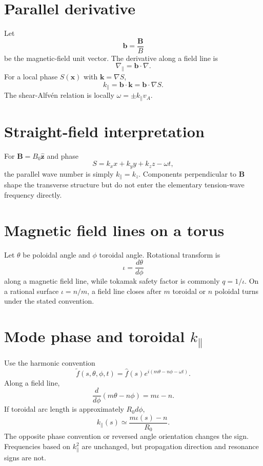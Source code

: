 \documentclass[11pt]{article}
\begin{document}
\section{Parallel derivative}

Let
\begin{equation}
\mathbf b=\frac{\mathbf B}{B}
\end{equation}
be the magnetic-field unit vector. The derivative along a field line is
\begin{equation}
\nabla_\parallel=\mathbf b\cdot\nabla.
\end{equation}
For a local phase $S(\mathbf x)$ with $\mathbf k=\nabla S$,
\begin{equation}
k_\parallel=\mathbf b\cdot\mathbf k=\mathbf b\cdot\nabla S.
\end{equation}
The shear-Alfvén relation is locally $\omega=\pm k_\parallel v_A$.


\section{Straight-field interpretation}

For $\mathbf B=B_0\hat{\mathbf z}$ and phase
\begin{equation}
S=k_xx+k_yy+k_zz-\omega t,
\end{equation}
the parallel wave number is simply $k_\parallel=k_z$. Components perpendicular to $\mathbf B$ shape the transverse structure but do not enter the elementary tension-wave frequency directly.


\section{Magnetic field lines on a torus}

Let $\theta$ be poloidal angle and $\phi$ toroidal angle. Rotational transform is
\begin{equation}
\iota=\frac{d\theta}{d\phi}
\end{equation}
along a magnetic field line, while tokamak safety factor is commonly $q=1/\iota$. On a rational surface $\iota=n/m$, a field line closes after $m$ toroidal or $n$ poloidal turns under the stated convention.


\section{Mode phase and toroidal $k_\parallel$}

Use the harmonic convention
\begin{equation}
\tilde f(s,\theta,\phi,t)
=\hat f(s)e^{i(m\theta-n\phi-\omega t)}.
\end{equation}
Along a field line,
\begin{equation}
\frac{d}{d\phi}(m\theta-n\phi)=m\iota-n.
\end{equation}
If toroidal arc length is approximately $R_0d\phi$,
\begin{equation}
\boxed{k_\parallel(s)\simeq\frac{m\iota(s)-n}{R_0}}.
\end{equation}
The opposite phase convention or reversed angle orientation changes the sign. Frequencies based on $k_\parallel^2$ are unchanged, but propagation direction and resonance signs are not.
\end{document}
